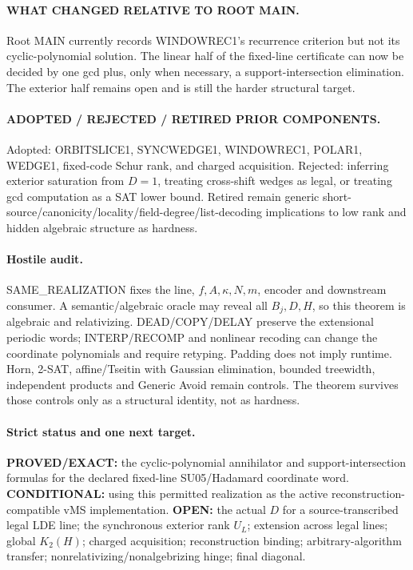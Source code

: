 \documentclass[11pt]{article}
\begin{document}
\paragraph{WHAT CHANGED RELATIVE TO ROOT MAIN.}
Root MAIN currently records WINDOWREC1's recurrence criterion but not its cyclic-polynomial solution. The linear half of the fixed-line certificate can now be decided by one gcd plus, only when necessary, a support-intersection elimination. The exterior half remains open and is still the harder structural target.

\paragraph{ADOPTED / REJECTED / RETIRED PRIOR COMPONENTS.}
Adopted: ORBITSLICE1, SYNCWEDGE1, WINDOWREC1, POLAR1, WEDGE1, fixed-code Schur rank, and charged acquisition. Rejected: inferring exterior saturation from \(D=1\), treating cross-shift wedges as legal, or treating gcd computation as a SAT lower bound. Retired remain generic short-source/canonicity/locality/field-degree/list-decoding implications to low rank and hidden algebraic structure as hardness.

\paragraph{Hostile audit.}
SAME\_REALIZATION fixes the line, \(f,A,\kappa,N,m\), encoder and downstream consumer. A semantic/algebraic oracle may reveal all \(B_j,D,H\), so this theorem is algebraic and relativizing. DEAD/COPY/DELAY preserve the extensional periodic words; INTERP/RECOMP and nonlinear recoding can change the coordinate polynomials and require retyping. Padding does not imply runtime. Horn, 2-SAT, affine/Tseitin with Gaussian elimination, bounded treewidth, independent products and Generic Avoid remain controls. The theorem survives those controls only as a structural identity, not as hardness.

\paragraph{Strict status and one next target.}
\textbf{PROVED/EXACT:} the cyclic-polynomial annihilator and support-intersection formulas for the declared fixed-line SU05/Hadamard coordinate word.
\textbf{CONDITIONAL:} using this permitted realization as the active reconstruction-compatible vMS implementation.
\textbf{OPEN:} the actual \(D\) for a source-transcribed legal LDE line; the synchronous exterior rank \(U_L\); extension across legal lines; global \(K_2(H)\); charged acquisition; reconstruction binding; arbitrary-algorithm transfer; nonrelativizing/nonalgebrizing hinge; final diagonal.
\end{document}
